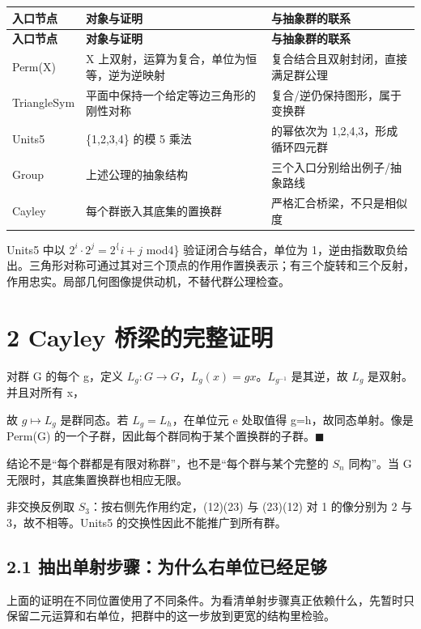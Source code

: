 \documentclass[UTF8,a4paper,zihao=-4,fontset=windows,openany]{ctexbook}
\newcommand{\mcsdisplay}[1]{%
  \par\addvspace{0.7em}%
  \sbox{\mcsmathbox}{\ensuremath{\displaystyle #1}}%
  \ifdim\wd\mcsmathbox>\linewidth
    \noindent\resizebox{\linewidth}{!}{\usebox{\mcsmathbox}}%
  \else
    \noindent\hspace*{\fill}\usebox{\mcsmathbox}\hspace*{\fill}%
  \fi
  \par\addvspace{0.7em}%
}
\def\ensuremath#1{#1}%
\def\mathrm#1{#1}%
\begin{document}
\begingroup\small\setlength{\tabcolsep}{4pt}
\begin{longtable}{>{\raggedright\arraybackslash}p{}>{\raggedright\arraybackslash}p{}>{\raggedright\arraybackslash}p{}}
\toprule
\textbf{入口节点} & \textbf{对象与证明} & \textbf{与抽象群的联系} \\
\midrule
\endfirsthead
\toprule
\textbf{入口节点} & \textbf{对象与证明} & \textbf{与抽象群的联系} \\
\midrule
\endhead
\bottomrule
\endfoot
\bottomrule
\endlastfoot
Perm(X) & X 上双射，运算为复合，单位为恒等，逆为逆映射 & 复合结合且双射封闭，直接满足群公理 \\
TriangleSym & 平面中保持一个给定等边三角形的刚性对称 & 复合/逆仍保持图形，属于变换群 \\
Units5 & \{1,2,3,4\} 的模 5 乘法 & 2 的幂依次为 1,2,4,3，形成循环四元群 \\
Group & 上述公理的抽象结构 & 三个入口分别给出例子/抽象路线 \\
Cayley & 每个群嵌入其底集的置换群 & 严格汇合桥梁，不只是相似度 \\
\end{longtable}
\endgroup

Units5 中以 \(2^i\cdot 2^j=2^\{i+j\) mod4\} 验证闭合与结合，单位为 1，逆由指数取负给出。三角形对称可通过其对三个顶点的作用作置换表示；有三个旋转和三个反射，作用忠实。局部几何图像提供动机，不替代群公理检查。

\section{2 Cayley 桥梁的完整证明}
对群 G 的每个 g，定义 \(L_g:G\to G\)，\(L_g(x)=\mathrm{gx}\)。\(L_{g^{-1}}\) 是其逆，故 \(L_g\) 是双射。并且对所有 x，


\mcsdisplay{(L_g\circ L_h)(x)=g(hx)=(gh)x=L_{gh}(x).}
\noindent 故 \(g\mapsto L_g\) 是群同态。若 \(L_g=L_h\)，在单位元 e 处取值得 g=h，故同态单射。像是 Perm(G) 的一个子群，因此每个群同构于某个置换群的子群。\(\blacksquare\)

结论不是“每个群都是有限对称群”，也不是“每个群与某个完整的 \(S_n\) 同构”。当 G 无限时，其底集置换群也相应无限。

非交换反例取 \(S_{3}\)：按右侧先作用约定，(12)(23) 与 (23)(12) 对 1 的像分别为 2 与 3，故不相等。Units5 的交换性因此不能推广到所有群。

\subsection{2.1 抽出单射步骤：为什么右单位已经足够}
上面的证明在不同位置使用了不同条件。为看清单射步骤真正依赖什么，先暂时只保留二元运算和右单位，把群中的这一步放到更宽的结构里检验。
\end{document}
